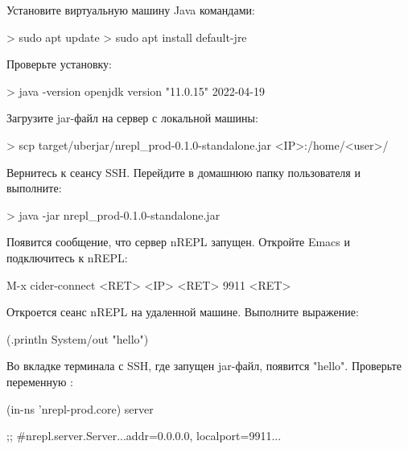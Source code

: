 Установите виртуальную машину Java командами:

\begin{english}
  \begin{bash}
> sudo apt update
> sudo apt install default-jre
  \end{bash}
\end{english}

Проверьте установку:

\begin{english}
  \begin{bash}
> java -version
openjdk version "11.0.15" 2022-04-19
  \end{bash}
\end{english}

Загрузите jar-файл на сервер с локальной машины:

\begin{english}
  \begin{bash}
> scp target/uberjar/nrepl_prod-0.1.0-standalone.jar <IP>:/home/<user>/
  \end{bash}
\end{english}

Вернитесь к сеансу SSH. Перейдите в домашнюю папку пользователя и выполните:

\begin{english}
  \begin{bash}
> java -jar nrepl_prod-0.1.0-standalone.jar
  \end{bash}
\end{english}

Появится сообщение, что сервер nREPL запущен. Откройте Emacs и подключитесь к nREPL:

\begin{english}
  \begin{text}
M-x cider-connect <RET> <IP> <RET> 9911 <RET>
  \end{text}
\end{english}

Откроется сеанс nREPL на удаленной машине. Выполните выражение:

\begin{english}
  \begin{clojure}
(.println System/out "hello")
  \end{clojure}
\end{english}

Во вкладке терминала с SSH, где запущен jar-файл, появится "hello". Проверьте переменную :

\begin{english}
  \begin{clojure}
(in-ns 'nrepl-prod.core)
server

;; #nrepl.server.Server{...addr=0.0.0.0, localport=9911...}
  \end{clojure}
\end{english}

